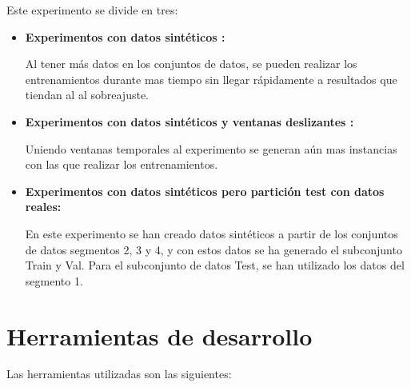 Este experimento se divide en tres:

\begin{itemize}
	
	\item
	\textbf{Experimentos con datos sintéticos :}
	
	Al tener más datos en los conjuntos de datos, se pueden realizar los entrenamientos durante mas tiempo sin llegar rápidamente a resultados que tiendan al al sobreajuste.

	\item
	\textbf{Experimentos con datos sintéticos y ventanas deslizantes :}
	
	Uniendo ventanas temporales al experimento se generan aún mas instancias con las que realizar los entrenamientos.
	
		\item
	\textbf{Experimentos con datos sintéticos pero partición test con datos reales:}
	
	En este experimento se han creado datos sintéticos a partir de los conjuntos de datos segmentos 2, 3 y 4, y con estos datos se ha generado el subconjunto Train y Val. Para el subconjunto de datos Test, se han utilizado los datos del segmento 1.
	
\end{itemize}	
	
\section{Herramientas de desarrollo}


Las herramientas utilizadas son las siguientes:

